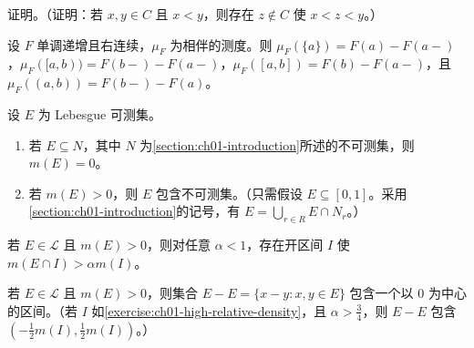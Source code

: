 \documentclass[../../main.tex]{subfiles}%
\begin{document}
\begin{exercise}\label{exercise:ch01-cantor-topology-proof}
证明。（证明：若 $x,y\in C$ 且 $x<y$，则存在 $z\notin C$ 使 $x<z<y$。）
\end{exercise}

\begin{exercise}\label{exercise:ch01-stieltjes-interval-values}
设 $F$ 单调递增且右连续，$\mu_F$ 为相伴的测度。则 $\mu_F(\{a\})=F(a)-F(a-)$，$\mu_F([a,b))=F(b-)-F(a-)$，$\mu_F([a,b])=F(b)-F(a-)$，且 $\mu_F((a,b))=F(b-)-F(a)$。
\end{exercise}

\begin{exercise}\label{exercise:ch01-nonmeasurable-subsets}
设 $E$ 为 Lebesgue 可测集。
\begin{enumerate}[label=\alph*.,ref=(\alph*)]
\item\label{item:ch01-vitali-measurable-subset} 若 $E\subseteq N$，其中 $N$ 为\cref{section:ch01-introduction}所述的不可测集，则 $m(E)=0$。
\item\label{item:ch01-positive-measure-nonmeasurable-subset} 若 $m(E)>0$，则 $E$ 包含不可测集。（只需假设 $E\subseteq[0,1]$。采用\cref{section:ch01-introduction}的记号，有 $E=\bigcup_{r\in R}E\cap N_r$。）
\end{enumerate}
\end{exercise}

\begin{exercise}\label{exercise:ch01-high-relative-density}
若 $E\in\mathscr{L}$ 且 $m(E)>0$，则对任意 $\alpha<1$，存在开区间 $I$ 使 $m(E\cap I)>\alpha m(I)$。
\end{exercise}

\begin{exercise}\label{exercise:ch01-difference-set-interval}
若 $E\in\mathscr{L}$ 且 $m(E)>0$，则集合 $E-E=\{x-y:x,y\in E\}$ 包含一个以 $0$ 为中心的区间。（若 $I$ 如\cref{exercise:ch01-high-relative-density}，且 $\alpha>\frac34$，则 $E-E$ 包含 $(-\frac12m(I),\frac12m(I))$。）
\end{exercise}
\end{document}
